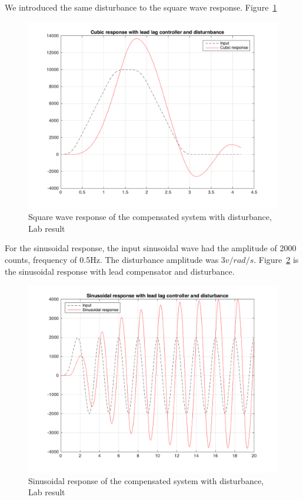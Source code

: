\documentclass[a4paper, 12pt]{article}
\begin{document}
We introduced the same disturbance to the square wave response. Figure~\ref{LabCubicResponseLeadLagDisturbance}
\begin{figure}[!htbp]
\centering
\includegraphics[scale = 0.3]{LabCubicResponseLeadLagDisturbance}
\caption{Square wave response of the compensated system with disturbance, Lab result}
\label{LabCubicResponseLeadLagDisturbance}
\end{figure}

For the sinusoidal response, the input sinusoidal wave had the amplitude of 2000 counts, frequency of 0.5Hz. The disturbance amplitude was $3v/rad/s$. Figure~\ref{LabSinusoidalResponseLeadLagDisturbance} is the sinusoidal response with lead compensator and disturbance. 

\begin{figure}[!htbp]
\centering
\includegraphics[scale = 0.3]{LabSinusoidalResponseLeadLagDisturbance}
\caption{Sinusoidal response of the compensated system with disturbance, Lab result}
\label{LabSinusoidalResponseLeadLagDisturbance}
\end{figure}
\end{document}
